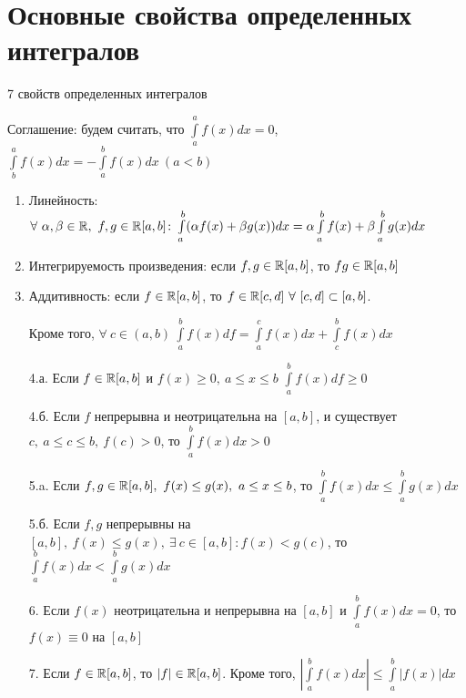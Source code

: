 \section{Основные свойства определенных интегралов}
\begin{theor}7 свойств определенных интегралов

Соглашение: будем считать, что $\int\limits^a_af(x)dx=0$, $\int\limits^a_bf(x)dx=-\int\limits^b_af(x)dx\ (a<b)$
\begin{enumerate}
\item Линейность: $\forall\ \alpha,\beta\in\R,\ f,g\in\R[a,b]\colon\int\limits^b_a(\alpha f(x)+\beta g(x))dx=\alpha\int\limits^b_af(x)+\beta\int\limits^b_ag(x)dx$
\item Интегрируемость произведения: если $f,g\in\mathbb{R}[a,b]$, то $fg\in\mathbb{R}[a,b]$
\item Аддитивность: если $f\in\mathbb{R}[a,b]$, то $f\in\R[c,d]\ \forall\ [c,d]\subset[a,b]$.

Кроме того, $\forall\ c\in(a,b)\ \int\limits^b_af(x)df=\int\limits^c_af(x)dx+\int\limits^b_cf(x)dx$
\item[4.а.] Если $f\in\mathbb{R}[a,b]$ и $f(x)\geq0,\ a\leq x\leq b$ \then $\int\limits^b_af(x)df\geq0$
\item[4.б.] Если $f$ непрерывна и неотрицательна на $[a,b]$, и существует $c,\ a\leq c \leq b,\ f(c)>0$, то $\int\limits^b_af(x)dx>0$
\item[5.a.] Если $f,g\in\mathbb{R}[a,b],\ f(x)\leq g(x),\ a\leq x\leq b$, то $\int\limits^b_af(x)dx\leq\int\limits^b_ag(x)dx$
\item[5.б.] Если $f,g$ непрерывны на $[a,b],\ f(x)\leq g(x),\ \exists\ c\in[a,b]\colon f(x)<g(c)$, то $\int\limits^b_af(x)dx<\int\limits^b_ag(x)dx$
\item[6.] Если $f(x)$ неотрицательна и непрерывна на $[a,b]$ и $\int\limits^b_af(x)dx=0$, то $f(x)\equiv0$ на $[a,b]$
\item[7.] Если $f\in\mathbb{R}[a,b]$, то $|f|\in\mathbb{R}[a,b]$. Кроме того, $|\int\limits^b_af(x)dx|\leq\int\limits^b_a|f(x)|dx$
\end{enumerate}
\end{theor}
